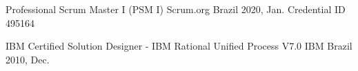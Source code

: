 

\begin{cventries}

  \cventry
    {Professional Scrum Master I (PSM I)} %
    {Scrum.org} %
    {Brazil} %
    {2020, Jan.} %
    {Credential ID 495164}

  \cventry
    {IBM Certified Solution Designer - IBM Rational Unified Process V7.0} %
    {IBM} %
    {Brazil} %
    {2010, Dec.} %
    {}

\end{cventries}



